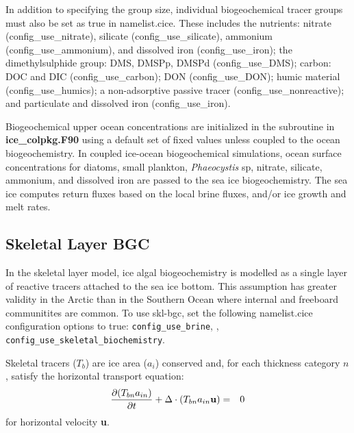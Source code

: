 In addition to specifying the group size, individual biogeochemical
tracer groups must also be set as true in namelist.cice.
These includes the nutrients: nitrate (config\_use\_nitrate), silicate
(config\_use\_silicate), ammonium (config\_use\_ammonium), and
dissolved iron (config\_use\_iron);  the dimethylsulphide group: DMS, DMSPp,
DMSPd (config\_use\_DMS); carbon: DOC and DIC (config\_use\_carbon);
DON (config\_use\_DON);
humic material (config\_use\_humics); a non-adsorptive passive tracer
(config\_use\_nonreactive); and particulate and dissolved iron (config\_use\_iron). 

Biogeochemical upper ocean concentrations are initialized in the
subroutine 
in {\bf ice\_colpkg.F90} using a default set of fixed values unless
coupled to the ocean biogeochemistry. In coupled ice-ocean
biogeochemical simulations, ocean surface concentrations for diatoms,
small plankton, {\it Phaeocystis} sp, nitrate, silicate, ammonium, and
dissolved iron are passed to the sea ice biogeochemistry.  The sea ice
computes return fluxes based on the local brine fluxes, and/or ice growth
and melt rates. 

\subsection{Skeletal Layer BGC}

In the skeletal layer model, ice algal biogeochemistry is modelled as a single layer
of reactive tracers attached to the sea ice bottom. This assumption
has greater validity in the Arctic than in the Southern Ocean where internal
and freeboard communitites are common.
To use skl-bgc, set the following namelist.cice configuration options
to true: {\tt config\_use\_brine}, ,
{\tt config\_use\_skeletal\_biochemistry}.

Skeletal tracers ($T_{b}$) are ice area ($a_{i}$) conserved
and, for each thickness category $n$, satisfy the horizontal transport equation: 
\begin{eqnarray}
\label{eqn:bgc_tracer_thickness_cons}
\frac{\partial (T_{bn} a_{in})}{\partial t} + \Delta \cdot (T_{bn} a_{in} {\bf u}) & = & 0
\end{eqnarray}
for horizontal velocity {\bf u}.

